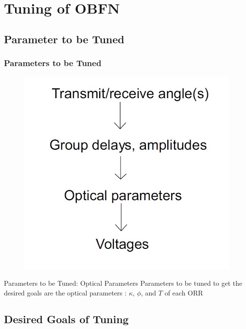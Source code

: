 \documentclass{beamer}
\begin{document}
\section{Tuning of OBFN}

\subsection{Parameter to be Tuned}

\begin{frame}\frametitle{Parameters to be Tuned}

	\begin{figure}
			\centering
			\includegraphics[width=0.4\linewidth]{images/project_layer}
	\end{figure}
	\begin{block}{Parameters to be Tuned: Optical Parameters}
		Parameters to be tuned to get the desired goals are the optical parameters : $\kappa$, $\phi$, and $T$ of each ORR\\
	\end{block}
\end{frame}

\subsection{Desired Goals of Tuning}
\end{document}
